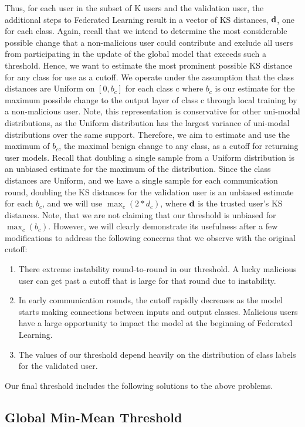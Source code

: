 \documentclass{article} %
\begin{document}
Thus, for each user in the subset of K users and the validation user, the additional steps to Federated Learning result in a vector of KS distances, ${\mathbf{d}}$, one for each class. Again, recall that we intend to determine the most considerable possible change that a non-malicious user could contribute and exclude all users from participating in the update of the global model that exceeds such a threshold. Hence, we want to estimate the most prominent possible KS distance for any class for use as a cutoff. We operate under the assumption that the class distances are Uniform on $[0, b_c]$ for each class c where $b_c$ is our estimate for the maximum possible change to the output layer of class c through local training by a non-malicious user. Note, this representation is conservative for other uni-modal distributions, as the Uniform distribution has the largest variance of uni-modal distributions over the same support. Therefore, we aim to estimate and use the maximum of $b_c$, the maximal benign change to any class, as a cutoff for returning user models. Recall that doubling a single sample from a Uniform distribution is an unbiased estimate for the maximum of the distribution. Since the class distances are Uniform, and we have a single sample for each communication round, doubling the KS distances for the validation user is an unbiased estimate for each $b_c$, and we will use $\max_c (2 * d_c)$, where ${\mathbf{d}}$ is the trusted user's KS distances. Note, that we are not claiming that our threshold is unbiased for $\max_c (b_c)$. However, we will clearly demonstrate its usefulness after a few modifications to address the following concerns that we observe with the original cutoff:
\begin{enumerate}
    \item There extreme instability round-to-round in our threshold. A lucky malicious user can get past a cutoff that is large for that round due to instability.
    \item In early communication rounds, the cutoff rapidly decreases as the model starts making connections between inputs and output classes. Malicious users have a large opportunity to impact the model at the beginning of Federated Learning.
    \item The values of our threshold depend heavily on the distribution of class labels for the validated user.
\end{enumerate}
Our final threshold includes the following solutions to the above problems.

%
\subsection{Global Min-Mean Threshold}
\end{document}
